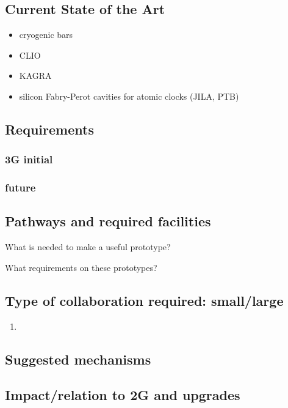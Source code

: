 \subsection{Current State of the Art}
\begin{itemize}
\item cryogenic bars
\item CLIO
\item KAGRA
\item silicon Fabry-Perot cavities for atomic clocks (JILA, PTB)
\end{itemize}
\subsection{Requirements}
\subsubsection{3G initial}
\subsubsection{future}
\subsection{Pathways and required facilities}
What is needed to make a useful prototype?

What requirements on these prototypes?
\subsection{Type of collaboration required:  small/large}
\begin{enumerate}
\item 
\end{enumerate}
\subsection{Suggested mechanisms}

\subsection{Impact/relation to 2G and upgrades}


